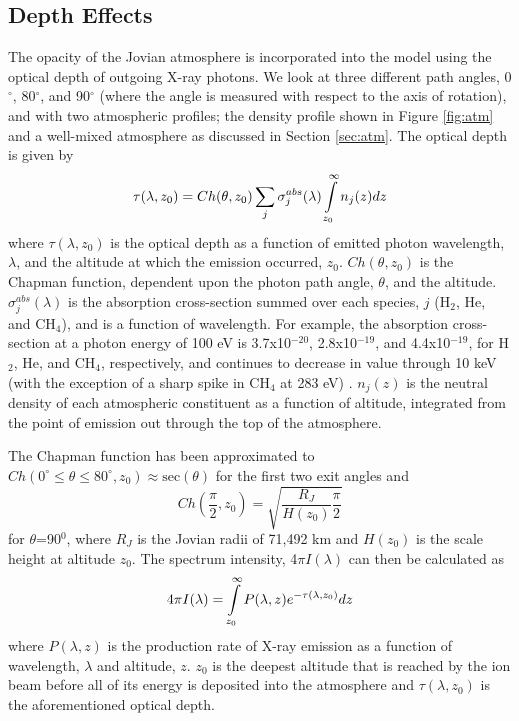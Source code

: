 \documentclass[draft]{agujournal2018}
\begin{document}
\subsection{Depth Effects}

The opacity of the Jovian atmosphere is incorporated into the model using the optical depth of outgoing X-ray photons.
We look at three different path angles, 0$^{\circ}$, 80$^{\circ}$, and 90$^{\circ}$ (where the angle is measured with respect to the axis of rotation), and with two atmospheric profiles; the density profile shown in Figure \ref{fig:atm} and a well-mixed atmosphere as discussed in Section \ref{sec:atm}.
The optical depth is given by
\begin{equation}
    \tau(\lambda,z_{0})=Ch(\theta,z_{0})\sum_{j}\sigma_{j}^{abs}(\lambda)\int\displaylimits_{z_{0}}^{\infty}n_{j}(z)dz
    \label{eqn:tau}
\end{equation}
where $\tau(\lambda,z_{0})$ is the optical depth as a function of emitted photon wavelength, $\lambda$, and the altitude at which the emission occurred, $z_{0}$.
$Ch(\theta,z_{0})$ is the Chapman function, dependent upon the photon path angle, $\theta$, and the altitude.
$\sigma_j^{abs}(\lambda)$ is the absorption cross-section summed over each species, $j$ (H$_2$, He, and CH$_4$), and is a function of wavelength.
For example, the absorption cross-section at a photon energy of 100 eV is 3.7x10$^{-20}$, 2.8x10$^{-19}$, and 4.4x10$^{-19}$, for H$_2$, He, and CH$_4$, respectively, and continues to decrease in value through 10 keV (with the exception of a sharp spike in CH$_4$ at 283 eV) \citep{cravens1995}.
$n_j(z)$ is the neutral density of each atmospheric constituent as a function of altitude, integrated from the point of emission out through the top of the atmosphere.

The Chapman function has been approximated to $Ch(0^{\circ} \leq \theta \leq 80^{\circ},z_{0}) \approx \mathrm{sec}(\theta)$ for the first two exit angles and
\begin{equation}
    Ch(\frac{\pi}{2},z_{0})=\sqrt{\frac{R_J}{H(z_0)}\frac{\pi}{2}}
    \label{eqn:Chap}
\end{equation}
for $\theta$=90$^{0}$, where $R_J$ is the Jovian radii of 71,492 km and $H(z_0)$ is the scale height at altitude $z_0$.
The spectrum intensity, 4$\pi I(\lambda)$ can then be calculated as
\begin{equation}
    4\pi I(\lambda)=\int\displaylimits_{z_0}^{\infty}P(\lambda,z)e^{-\tau(\lambda,z_0)}dz
    \label{eqn:I}
\end{equation}
where $P(\lambda,z)$ is the production rate of X-ray emission as a function of wavelength, $\lambda$ and altitude, $z$.
$z_0$ is the deepest altitude that is reached by the ion beam before all of its energy is deposited into the atmosphere and $\tau(\lambda,z_0)$ is the aforementioned optical depth.
\end{document}
